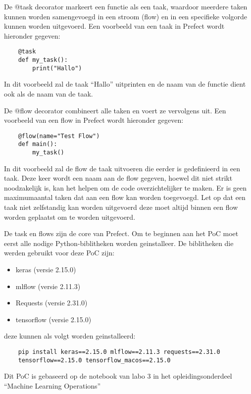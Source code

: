 De @task decorator markeert een functie als een taak, waardoor meerdere taken kunnen worden samengevoegd in een stroom (flow) en in een specifieke volgorde kunnen worden uitgevoerd. Een voorbeeld van een taak in Prefect wordt hieronder gegeven:
\begin{verbatim}
    @task
    def my_task():
        print("Hallo")
\end{verbatim}

In dit voorbeeld zal de taak ``Hallo'' uitprinten en de naam van de functie dient ook als de naam van de taak.

De @flow decorator combineert alle taken en voert ze vervolgens uit. Een voorbeeld van een flow in Prefect wordt hieronder gegeven:
\begin{verbatim}
    @flow(name="Test Flow")
    def main():
        my_task()
\end{verbatim}
In dit voorbeeld zal de flow de taak uitvoeren die eerder is gedefinieerd in een taak. Deze keer wordt een naam aan de flow gegeven, hoewel dit niet strikt noodzakelijk is, kan het helpen om de code overzichtelijker te maken. Er is geen maximumaantal taken dat aan een flow kan worden toegevoegd. Let op dat een taak niet zelfstandig kan worden uitgevoerd deze moet altijd binnen een flow worden geplaatst om te worden uitgevoerd.

De task en flows zijn de core van Prefect. Om te beginnen aan het PoC moet eerst alle nodige Python-biblitheken worden geinstalleer.
De biblitheken die werden gebruikt voor deze PoC zijn:
\begin{itemize}
    \item keras (versie 2.15.0)
    \item mlflow (versie 2.11.3)
    \item Requests (versie 2.31.0)
    \item tensorflow (versie 2.15.0)
\end{itemize}

deze kunnen als volgt worden geinstalleerd: 

\begin{verbatim}
    pip install keras==2.15.0 mlflow==2.11.3 requests==2.31.0
    tensorflow==2.15.0 tensorflow_macos==2.15.0
\end{verbatim}

Dit PoC is gebaseerd op de notebook van labo 3 in het opleidingsonderdeel ``Machine Learning Operations''


